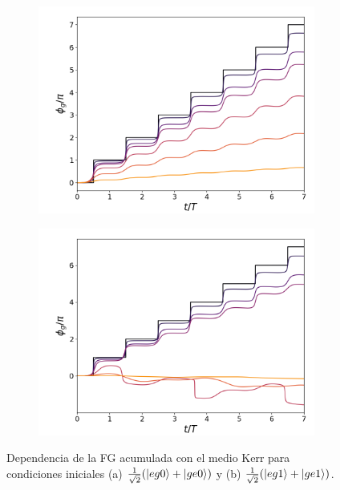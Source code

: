 \begin{figure}[h]
    \centering
    \begin{subfigure}{0.49\textwidth}
        \includegraphics[width=\textwidth]{figuras/ch5/dependencia/eg0+/kerr todo 0.png}
        \caption{}
        \label{fig5:dependencia kerr eg0}
    \end{subfigure}
    \hfill
    \begin{subfigure}{0.49\textwidth}
        \includegraphics[width=\textwidth]{figuras/ch5/dependencia/eg1+/kerr todo 0.png}
        \caption{}
        \label{fig5:dependencia kerr eg1}
    \end{subfigure}
    \caption{Dependencia de la FG acumulada con el medio Kerr para condiciones iniciales (a) $\frac{1}{\sqrt{2}}(\ket{eg0}+\ket{ge0})$ y (b) $\frac{1}{\sqrt{2}}(\ket{eg1}+\ket{ge1})$.}
    \label{fig5:dependencia kerr}
\end{figure}

